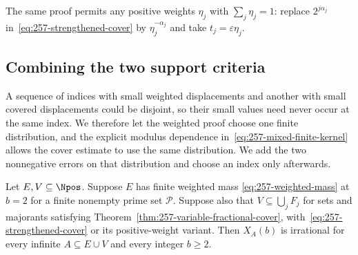 The same proof permits any positive weights $\eta_j$ with $\sum_j\eta_j=1$:
replace $2^{j\alpha_j}$ in~\eqref{eq:257-strengthened-cover} by
$\eta_j^{-\alpha_j}$ and take $t_j=\varepsilon\eta_j$.
\subsection{Combining the two support criteria}
A sequence of indices with small weighted displacements and another
with small covered displacements could be disjoint, so their small values
need never occur at the same index. We therefore let the weighted proof
choose one finite distribution, and the explicit modulus dependence
in~\eqref{eq:257-mixed-finite-kernel} allows the cover estimate to use
the same distribution. We add the two nonnegative errors on that
distribution and choose an index only afterwards.
\begin{thm}\label{thm:257-mixed-supports}
Let $E,V\subseteq\Npos$.  Suppose $E$ has finite weighted mass
\eqref{eq:257-weighted-mass} at $b=2$ for a finite nonempty prime set
$\mathcal P$.  Suppose also that $V\subseteq\bigcup_jF_j$ for sets and
majorants satisfying Theorem~\ref{thm:257-variable-fractional-cover},
with~\eqref{eq:257-strengthened-cover} or its positive-weight variant.
Then $X_A(b)$ is irrational for every
infinite $A\subseteq E\cup V$ and every integer $b\ge2$.
\end{thm}
